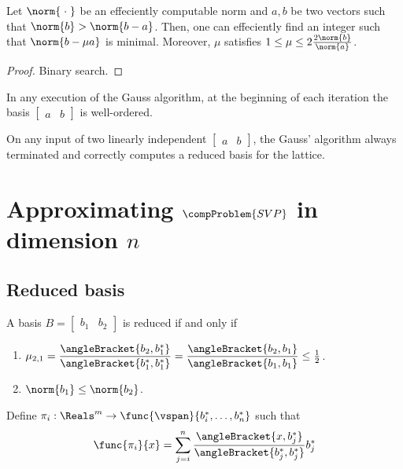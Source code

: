 \begin{lemma}
    Let \(\norm{\; \cdot \;}\) be an effeciently computable norm and \(a,b\) be two vectors such that \(\norm{b} > \norm{b - a}\). Then, one can effeciently find an integer such that \(\norm{b - \mu a}\) is minimal. Moreover, \(\mu\) satisfies \(1 \leq \mu \leq 2 \frac{2 \norm{b}}{\norm{a}}\).
\end{lemma}
\begin{proof}
    Binary search.
\end{proof}
\begin{lemma}
    In any execution of the Gauss algorithm, at the beginning of each iteration the basis \(\begin{bmatrix*}  a & b  \end{bmatrix*}\) is well-ordered.
\end{lemma}

\begin{theorem}
    On any input of two linearly independent \(\begin{bmatrix*}  a & b  \end{bmatrix*}\), the Gauss' algorithm always terminated and correctly computes a reduced basis for the lattice.
\end{theorem}

\section{Approximating \(\compProblem{SVP}\) in dimension \(n\)}
\subsection{Reduced basis}
\begin{definition}
    A basis \(B = \begin{bmatrix*}
        b_1 & b_2
    \end{bmatrix*}\) is reduced if and only if 
    \begin{enumerate}
        \item \(\mu_{2,1} = \dfrac{\angleBracket{b_2,b_1^{\ast}}}{\angleBracket{b_1^{\ast},b_1^{\ast}}} =  \dfrac{\angleBracket{b_2,b_1}}{\angleBracket{b_1,b_1}}\leq \frac{1}{2}\).
        \item \(\norm{b_1} \leq \norm{b_2}\).
    \end{enumerate}
\end{definition}
Define \(\pi_i: \Reals^m \to \func{\vspan}{b_i^{\ast}, \dots, b_n^{\ast}} \) such that 
\begin{equation*}
    \func{\pi_i}{x} = \sum_{j = i}^n \dfrac{\angleBracket{x,b_j^{\ast}}}{\angleBracket{b_j^{\ast},b_j^{\ast}}}b_j^{\ast}
\end{equation*}


